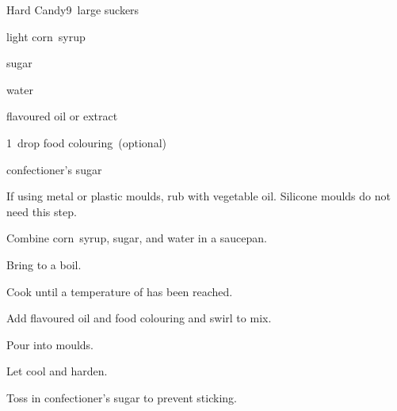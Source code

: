 \begin{recipe}{Hard Candy}{}{9~large suckers}

\begin{ingredients}
\item \C{\third} light corn~syrup
\item {} sugar
\item \C{\half} water
\item \tp{\eighth} flavoured oil or \tp{\quarter} extract
\item 1~drop food colouring~(optional)
\item confectioner's sugar
\end{ingredients}

\begin{directions}
\item If using metal or plastic moulds, rub with vegetable oil. Silicone moulds do not need this step.
\item Combine corn~syrup, sugar, and water in a saucepan.
\item Bring to a boil.
\item Cook until a temperature of  has been reached.
\item Add flavoured oil and food colouring and swirl to mix.
\item Pour into moulds.
\item Let cool and harden.
\item Toss in confectioner's sugar to prevent sticking.
\end{directions}

\end{recipe}
